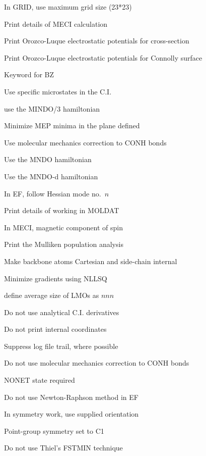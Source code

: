 \begin{description}
\item[] In GRID, use maximum grid size (23*23)
\item[] Print details of MECI calculation
\item[] Print Orozco-Luque electrostatic potentials for cross-section
\item[] Print Orozco-Luque electrostatic potentials for Connolly surface
\item[] Keyword for BZ
\item[] Use specific microstates in the C.I.
\item[] use the MINDO/3 hamiltonian
\item[] Minimize MEP minima in the plane defined
\item[] Use molecular mechanics correction to CONH bonds
\item[] Use the MNDO hamiltonian
\item[] Use the MNDO-d hamiltonian
\item[] In EF, follow Hessian mode no.\ $n$
\item[] Print details of working in MOLDAT
\item[] In MECI, magnetic component of spin
\item[] Print the Mulliken population analysis
\item[] Make backbone atoms Cartesian and side-chain internal
\item[] Minimize gradients using NLLSQ
\item[] define average size of LMOs as $nnn$
\item[] Do not use analytical C.I. derivatives
\item[] Do not print internal coordinates
\item[] Suppress log file trail, where possible
\item[] Do not use molecular mechanics correction to CONH bonds
\item[] NONET state required
\item[] Do not use Newton-Raphson method in EF
\item[] In symmetry work, use supplied orientation
\item[] Point-group symmetry set to C1
\item[] Do not use Thiel's FSTMIN technique

\end{description}
